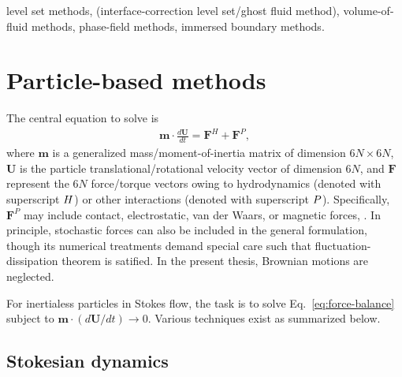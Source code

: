 level set methods,
(interface-correction level set/ghost fluid method),
volume-of-fluid methods,
phase-field methods,
immersed boundary methods.


\section{Particle-based methods}

The central equation to solve is
\begin{equation} 
 \begin{aligned} \label{eq:force-balance}
  {\bm m} \cdot \frac{d{\bm U}}{dt} = {\bm F}^H + {\bm F}^P, 
 \end{aligned}
\end{equation}
where ${\bm m}$ is a generalized mass/moment-of-inertia matrix of dimension $6N \times 6N$,
${\bm U}$ is the particle translational/rotational velocity vector of dimension $6N$,
and ${\bm F}$ represent the $6N$ force/torque vectors owing to hydrodynamics (denoted with superscript $\footnotesize H$) or other interactions (denoted with superscript $\footnotesize P$). Specifically, ${\bm F}^P$ may include contact, electrostatic, van der Waars, or magnetic forces, \etc. In principle, stochastic forces can also be included in the general formulation, though its numerical treatments demand special care such that fluctuation-dissipation theorem is satified. In the present thesis, Brownian motions are neglected.

For inertialess particles in Stokes flow, the task is to solve Eq.\ \eqref{eq:force-balance} subject to ${\bm m} \cdot (d{\bm U}/dt) \to 0$. Various techniques exist as summarized below.

\subsection{Stokesian dynamics}

